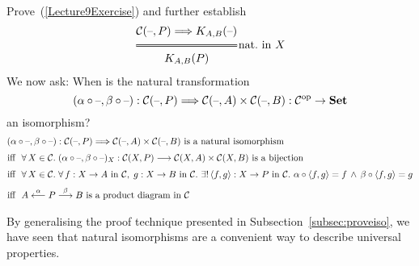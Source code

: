 \begin{exercise}
Prove~(\ref{Lecture9Exercise}) and further establish
\[
  \Efrac
    {\lscat C(\phold,P)\Longrightarrow K_{A,B}(\phold)}
    {K_{A,B}(P)}
  \text{nat.~in $X$}
\]
\end{exercise}

We now ask:  When is the natural transformation 
\[
(\alpha\circ\text{--},\beta\circ\text{--})
: \mathcal{C}(\text{--},P)\Longrightarrow\mathcal{C}(\text{--},A)\times\mathcal{C}(\text{--},B)
: \mathcal{C}^{\mathrm{op}}\to\mathbf {Set}
\]
an isomorphism?
\begin{align*}
& \hspace*{-5.5mm}
(\alpha\comp\phold,\beta\comp\phold)
: \lscat C (\phold, P) 
    \natarrow \lscat C (\phold, A) \times \lscat C (\phold, B) 
\text{ is a natural isomorphism}
\\[1mm]
\text{iff }\ & 
\forall\, X\in\lscat C.\;
  (\alpha\comp\phold,\beta\comp\phold)_X
  : \lscat C (X, P) \morpharrow \lscat C (X, A) \times \lscat C (X, B)
  \textrm{ is a bijection}
\\[1mm]
\text{iff }\ & 
\forall\, X\in\lscat C.\;
  \forall\, f: X \to A\text{ in }\lscat C,\;
            g: X \to B\text{ in }\lscat C.\ 
    \exists!\, \langle f, g \rangle : X \to P\text{ in }\lscat C.\ 
      \alpha \comp \langle f, g \rangle = f 
      \,\wedge\,
      \beta \comp \langle f, g \rangle = g 
\\[1mm]
\textrm{iff }\ & 
A \overset{\alpha}{\longleftarrow} P \morpharr{\beta} B 
\text{ is a product diagram in }\lscat C
\end{align*}

By generalising the proof technique presented in
Subsection~\ref{subsec:proveiso}, %
we have seen that natural isomorphisms are a convenient way to describe
universal properties.

